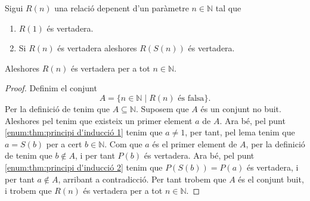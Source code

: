 \documentclass[../Apunts.tex]{subfiles}
\begin{document}
	\begin{theorem}
		\label{thm:principi d'inducció}
		Sigui \(R(n)\) una relació depenent d'un paràmetre \(n\in\mathbb{N}\) tal que
		\begin{enumerate}
			\item\label{enum:thm:principi d'inducció 1} \(R(1)\) és vertadera.
			\item\label{enum:thm:principi d'inducció 2} Si \(R(n)\) és vertadera aleshores \(R(S(n))\) és vertadera.
		\end{enumerate}
		Aleshores \(R(n)\) és vertadera per a tot \(n\in\mathbb{N}\).
		\begin{proof}
			Definim el conjunt
			\[A=\{n\in\mathbb{N}\mid R(n)\text{ és falsa}\}.\]
			Per la definició de  tenim que \(A\subseteq\mathbb{N}\). Suposem que \(A\) és un conjunt no buit. Aleshores pel  tenim que existeix un primer element \(a\) de \(A\). Ara bé, pel punt \eqref{enum:thm:principi d'inducció 1} tenim que \(a\neq1\), per tant, pel lema  tenim que \(a=S(b)\) per a cert \(b\in\mathbb{N}\). Com que \(a\) és el primer element de \(A\), per la definició de  tenim que \(b\notin A\), i per tant \(P(b)\) és vertadera. Ara bé, pel punt \eqref{enum:thm:principi d'inducció 2} tenim que \(P(S(b))=P(a)\) és vertadera, i per tant \(a\notin A\), arribant a contradicció. Per tant trobem que \(A\) és el conjunt buit, i trobem que \(R(n)\) és vertadera per a tot \(n\in\mathbb{N}\).
		\end{proof}
	\end{theorem}
\end{document}
